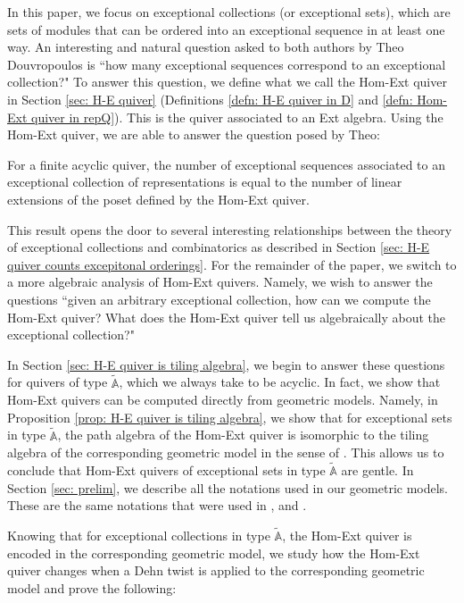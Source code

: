 \documentclass[12pt]{amsart}
\theoremstyle{plain}
\newenvironment{customthm}[1]
    {\renewcommand
    \theinnercustomthm{#1}\innercustomthm}{\endinnercustomthm}
\theoremstyle{definition}
\theoremstyle{remark}
\begin{document}
In this paper, we focus on exceptional collections (or exceptional sets), which are sets of modules that can be ordered into an exceptional sequence in at least one way. An interesting and natural question asked to both authors by Theo Douvropoulos is ``how many exceptional sequences correspond to an exceptional collection?" To answer this question, we define what we call the Hom-Ext quiver in Section \ref{sec: H-E quiver} (Definitions \ref{defn: H-E quiver in D} and \ref{defn: Hom-Ext quiver in repQ}). This is the quiver associated to an Ext algebra. Using the Hom-Ext quiver, we are able to answer the question posed by Theo:

\begin{customthm}{A}[Theorem \ref{thm: linear extensions and exceptional sequences}]\label{thm A}
For a finite acyclic quiver, the number of exceptional sequences associated to an exceptional collection of representations is equal to the number of linear extensions of the poset defined by the Hom-Ext quiver.
\end{customthm}

This result opens the door to several interesting relationships between the theory of exceptional collections and combinatorics as described in Section \ref{sec: H-E quiver counts excepitonal orderings}. For the remainder of the paper, we switch to a more algebraic analysis of Hom-Ext quivers. Namely, we wish to answer the questions ``given an arbitrary exceptional collection, how can we compute the Hom-Ext quiver? What does the Hom-Ext quiver tell us algebraically about the exceptional collection?"

In Section \ref{sec: H-E quiver is tiling algebra}, we begin to answer these questions for quivers of type $\tilde{\mathbb{A}}$, which we always take to be acyclic. In fact, we show that Hom-Ext quivers can be computed directly from geometric models. Namely, in Proposition \ref{prop: H-E quiver is tiling algebra}, we show that for exceptional sets in type $\tilde{\mathbb{A}}$, the path algebra of the Hom-Ext quiver is isomorphic to the tiling algebra of the corresponding geometric model in the sense of \cite{baur2021geometric}. This allows us to conclude that Hom-Ext quivers of exceptional sets in type $\tilde{\mathbb{A}}$ are gentle. In Section \ref{sec: prelim}, we describe all the notations used in our geometric models. These are the same notations that were used in \cite{maresca2022combinatorics}, and \cite{igusa2024clusters}.

Knowing that for exceptional collections in type $\tilde{\mathbb{A}}$, the Hom-Ext quiver is encoded in the corresponding geometric model, we study how the Hom-Ext quiver changes when a Dehn twist is applied to the corresponding geometric model and prove the following:
\end{document}
